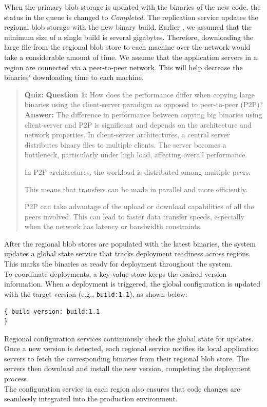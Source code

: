 When the primary blob storage is updated with the binaries of the new code, the status in the queue is changed to \emph{Completed}. The replication service updates the regional blob storage with the new binary build. Earlier , we assumed that the minimum size of a single build is several gigabytes. Therefore, downloading the large file from the regional blob store to each machine over the network would take a considerable amount of time. We assume that the application servers in a region are connected via a peer-to-peer network. This will help decrease the binaries' downloading time to each machine.

\begin{quote}
\textbf{Quiz:}
\textbf{Question 1:} How does the performance differ when copying large binaries using the client-server paradigm as opposed to peer-to-peer (P2P)?
\textbf{Answer:} The difference in performance between copying big binaries using client-server and P2P is significant and depends on the architecture and network properties. In client-server architectures, a central server distributes binary files to multiple clients. The server becomes a bottleneck, particularly under high load, affecting overall performance.

In P2P architectures, the workload is distributed among multiple peers.

This means that transfers can be made in parallel and more efficiently.

P2P can take advantage of the upload or download capabilities of all the peers involved. This can lead to faster data transfer speeds, especially when the network has latency or bandwidth constraints.
\end{quote}

After the regional blob stores are populated with the latest binaries, the system updates a global state service that tracks deployment readiness across regions. This marks the binaries as ready for deployment throughout the system.
\\
To coordinate deployments, a key-value store keeps the desired version information. When a deployment is triggered, the global configuration is updated with the target version (e.g., \texttt{build:1.1}), as shown below:

\begin{lstlisting}[language=plaintext]
{ build_version: build:1.1
}
\end{lstlisting}

Regional configuration services continuously check the global state for updates. Once a new version is detected, each regional service notifies its local application servers to fetch the corresponding binaries from their regional blob store. The servers then download and install the new version, completing the deployment process.
\\
The configuration service in each region also ensures that code changes are seamlessly integrated into the production environment.

